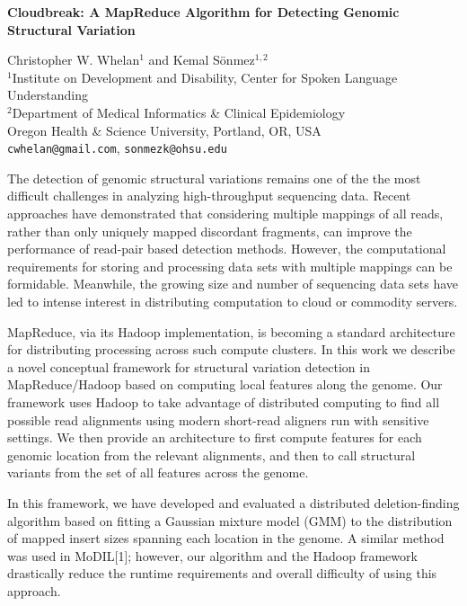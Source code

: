 \documentclass[11pt,a4paper]{article}
\begin{document}
\thispagestyle{empty}
%
\begin{center}
\textbf{Cloudbreak: A MapReduce Algorithm for Detecting Genomic Structural Variation}
\end{center}

\begin{center}
Christopher W. Whelan$^1$ and Kemal S\"onmez$^{1,2}$
\\
$^1$Institute on Development and Disability, Center for Spoken Language Understanding \\
$^2$Department of Medical Informatics \& Clinical Epidemiology \\
Oregon Health \& Science University, Portland, OR, USA \\
\texttt{cwhelan@gmail.com}, \texttt{sonmezk@ohsu.edu}

\end{center}

The detection of genomic structural variations remains one of the the most difficult challenges in analyzing high-throughput sequencing data. Recent approaches have demonstrated that considering multiple mappings of all reads, rather than only uniquely mapped discordant fragments, can improve the performance of read-pair based detection methods. However, the computational requirements for storing and processing data sets with multiple mappings can be formidable. Meanwhile, the growing size and number of sequencing data sets have led to intense interest in distributing computation to cloud or commodity servers. 

MapReduce, via its Hadoop implementation, is becoming a standard
architecture for distributing processing across such compute
clusters. In this work we describe a novel conceptual
framework for structural variation detection in
MapReduce/Hadoop based on computing local features along the
genome. Our framework uses Hadoop to take advantage of distributed
computing to find all possible read alignments using modern short-read
aligners run with sensitive settings. We then provide an architecture
to first compute features for each
genomic location from the relevant alignments, and
then to call structural variants from the set of all features across
the genome.

In this framework, we have developed and evaluated a distributed
deletion-finding algorithm based on fitting a Gaussian mixture model
(GMM) to the distribution of mapped insert sizes spanning each
location in the genome. A similar method was used in MoDIL[1];
however, our algorithm and the Hadoop framework drastically reduce
the runtime requirements and overall difficulty of using this approach.
\end{document}

